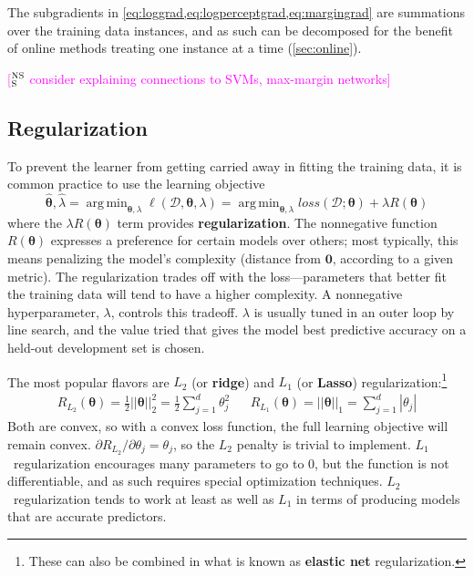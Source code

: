 \documentclass[11pt,letterpaper]{article}
\DeclareMathOperator*{\argmin}{arg\,min}
\newcommand{\ensuretext}[1]{#1}
\newcommand{\nssmarker}{\ensuretext{\textcolor{magenta}{\ensuremath{^{\textsc{NS}}_{\textsc{S}}}}}}
\newcommand{\arkcomment}[3]{\ensuretext{\textcolor{#3}{[#1 #2]}}}
\newcommand{\nss}[1]{\arkcomment{\nssmarker}{#1}{magenta}}
\begin{document}
The subgradients in \cref{eq:loggrad,eq:logperceptgrad,eq:margingrad} 
are summations over the training data instances, and as such can be decomposed 
for the benefit of online methods treating one instance at a time (\cref{sec:online}).

\nss{consider explaining connections to SVMs, max-margin networks}

\subsection{Regularization}\label{sec:reg}

To prevent the learner from getting carried away in fitting the training data, 
it is common practice to use the learning objective
\begin{equation}
\hat{\boldsymbol{\theta}}, \hat{\lambda} = \argmin_{\boldsymbol{\theta}, \lambda}\ell(\mathcal{D}, \boldsymbol{\theta}, \lambda) = \argmin_{\boldsymbol{\theta}, \lambda}\textit{loss}(\mathcal{D}; \boldsymbol{\theta}) + \lambda R(\boldsymbol{\theta})
\end{equation} 
where the $\lambda R(\boldsymbol{\theta})$ term provides \textbf{regularization}.
The nonnegative function $R(\boldsymbol{\theta})$ expresses a preference for certain models over others; 
most typically, this means penalizing the model's complexity (distance from $\mathbf{0}$, according to a given metric).
The regularization trades off with the loss---parameters that better fit the training data will tend to have a higher complexity. 
A nonnegative hyperparameter, $\lambda$, controls this tradeoff. 
$\lambda$ is usually tuned in an outer loop by line search, 
and the value tried that gives the model best predictive accuracy on a held-out development set is chosen.

The most popular flavors are $L_2$ (or \textbf{ridge}) and $L_1$ (or \textbf{Lasso}) regularization:\footnote{These can also be combined in what is known as \textbf{elastic net} regularization.}
\begin{eqnarray}
R_{L_2}(\boldsymbol{\theta}) = \tfrac{1}{2} ||\boldsymbol{\theta}||^2_2 = \tfrac{1}{2} \sum_{j=1}^d \theta^2_j &&
R_{L_1}(\boldsymbol{\theta}) = ||\boldsymbol{\theta}||_1 = \sum_{j=1}^d |\theta_j|
\end{eqnarray}
Both are convex, so with a convex loss function, the full learning objective will remain convex.
$\partial R_{L_2} / \partial \theta_j = \theta_j$, 
so the $L_2$ penalty is trivial to implement.
$L_1$~regularization encourages many parameters to go to 0, but the function is not differentiable, 
and as such requires special optimization techniques.
$L_2$~regularization tends to work at least as well as $L_1$ in terms of producing models
that are accurate predictors.
\end{document}

